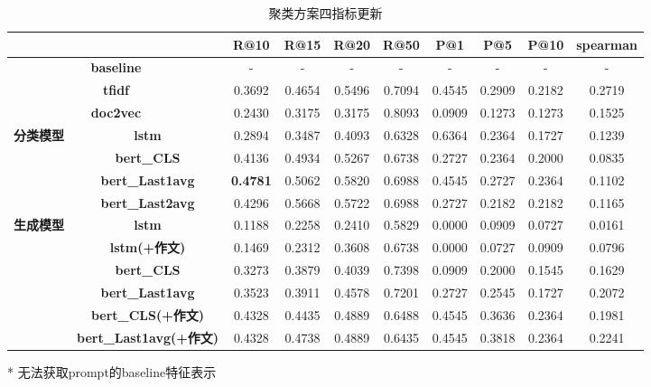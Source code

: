 \documentclass[11pt]{article}
\begin{document}
\begin{CJK}{UTF8}{gkai}
\begin{table}[htbp]\small
  \centering
    \begin{tabular}{c|c|c|c|c|c|c|c|c|c}
      \hline
      \multicolumn{2}{c|}{} & \textbf{R@10} & \textbf{R@15} & \textbf{R@20} & \textbf{R@50} & \textbf{P@1} & \textbf{P@5} & \textbf{P@10} & \textbf{spearman} \\
      \hline
      \multicolumn{2}{c|}{\textbf{baseline}} & -     & -     & -     & -     & -     & -     & -     & - \\
      \hline
      \multicolumn{2}{c|}{\textbf{tfidf}} & 0.3692  & 0.4654  & 0.5496  & 0.7094  & 0.4545  & 0.2909  & 0.2182  & 0.2719  \\
      \hline
      \multicolumn{2}{c|}{\textbf{doc2vec}} & 0.2430  & 0.3175  & 0.3175  & 0.8093  & 0.0909  & 0.1273  & 0.1273  & 0.1525  \\
      \hline
      \multirow{4}[0]{*}{\textbf{分类模型}} & \textbf{lstm} & 0.2894  & 0.3487  & 0.4093  & 0.6328  & 0.6364  & 0.2364  & 0.1727  & 0.1239  \\
      & \textbf{bert\_CLS} & 0.4136  & 0.4934  & 0.5267  & 0.6738  & 0.2727  & 0.2364  & 0.2000  & 0.0835  \\
      & \textbf{bert\_Last1avg} & \textcolor[rgb]{ 1,  0,  0}{\textbf{0.4781 }} & 0.5062  & 0.5820  & 0.6988  & 0.4545  & 0.2727  & 0.2364  & 0.1102  \\
      & \textbf{bert\_Last2avg} & 0.4296  & 0.5668  & 0.5722  & 0.6988  & 0.2727  & 0.2182  & 0.2182  & 0.1165  \\
      \hline
      \multirow{6}[0]{*}{\textbf{生成模型}} & \textbf{lstm} & 0.1188  & 0.2258  & 0.2410  & 0.5829  & 0.0000  & 0.0909  & 0.0727  & 0.0161  \\
      & \textbf{lstm(+作文)} & 0.1469  & 0.2312  & 0.3608  & 0.6738  & 0.0000  & 0.0727  & 0.0909  & 0.0796  \\
      & \textbf{bert\_CLS} & 0.3273  & 0.3879  & 0.4039  & 0.7398  & 0.0909  & 0.2000  & 0.1545  & 0.1629  \\
      & \textbf{bert\_Last1avg} & 0.3523  & 0.3911  & 0.4578  & 0.7201  & 0.2727  & 0.2545  & 0.1727  & 0.2072  \\
      & \textbf{bert\_CLS(+作文)} & 0.4328  & 0.4435  & 0.4889  & 0.6488  & 0.4545  & 0.3636  & 0.2364  & 0.1981  \\
      & \textbf{bert\_Last1avg(+作文)} & 0.4328  & 0.4738  & 0.4889  & 0.6435  & 0.4545  & 0.3818  & 0.2364  & 0.2241  \\
      \hline
    \end{tabular}%
    \begin{tablenotes}    %
      \footnotesize               %
      \item [*] 无法获取prompt的baseline特征表示
    \end{tablenotes} 
    \caption{聚类方案四指标更新}
  \label{tab:addlabel}%
\end{table}%

\end{CJK}
\end{document}
